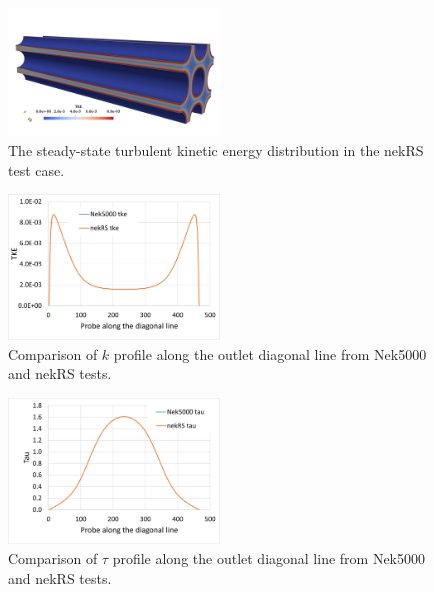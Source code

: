 \begin{figure}[!ht]
\centering
\includegraphics[width=0.5\textwidth]{./figures/TKE_in_bundle.png}
\caption{The steady-state turbulent kinetic energy distribution in the nekRS test case. }
\label{fig:tkeofbundle}
\end{figure}

\begin{figure}[!ht]
\centering
\includegraphics[width=0.5\textwidth]{./figures/tke_verification_bundle2x2.png}
\caption{Comparison of $k$ profile along the outlet diagonal line from Nek5000 and nekRS tests. }
\label{fig:tkeplot}
\end{figure}

\begin{figure}[!ht]
\centering
\includegraphics[width=0.5\textwidth]{./figures/tau_verification_bundle2x2.png}
\caption{Comparison of $\tau$ profile along the outlet diagonal line from Nek5000 and nekRS tests. }
\label{fig:tauplot}
\end{figure}
